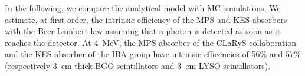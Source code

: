 \documentclass[a4paper,english,12pt]{article}
\newcommand{\mc}[3]{\multicolumn{#1}{#2}{#3}}
\newcommand{\answ}[1]{\todo[linecolor=blue,backgroundcolor=blue!25,bordercolor=blue]{#1}}
\begin{document}



In the following, we compare the analytical model with MC simulations. We estimate, at first order, the intrinsic efficiency of the MPS and KES absorbers with the Beer-Lambert law assuming that a photon is detected as soon as it reaches the detector. At 4~MeV, the MPS absorber of the CLaRyS collaboration and the KES absorber of the IBA group have intrinsic efficencies of 56\% and 57\% (respectively 3~cm thick BGO scintillators and 3~cm LYSO scintillators).


\end{document}

